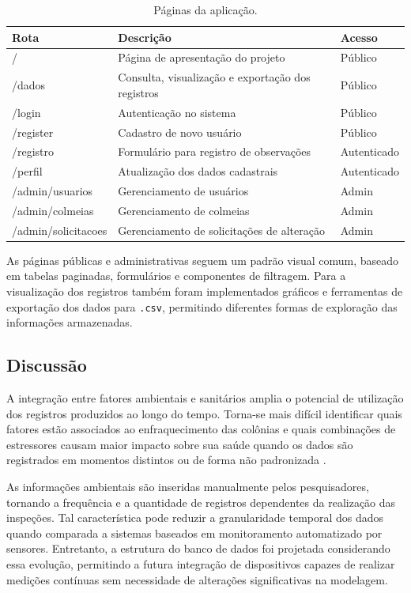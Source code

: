 \documentclass[12pt]{unisenaiclass}
\begin{document}
\renewcommand{\arraystretch}{1.0}

\begin{longtable}{lp{5cm}l}
\caption{Páginas da aplicação.}
\label{tab:paginas}\\

\hline
\textbf{Rota} & \textbf{Descrição} & \textbf{Acesso} \\
\hline
/ & Página de apresentação do projeto & Público \\
/dados & Consulta, visualização e exportação dos registros & Público \\
/login & Autenticação no sistema & Público \\
/register & Cadastro de novo usuário & Público \\
/registro & Formulário para registro de observações & Autenticado \\
/perfil & Atualização dos dados cadastrais & Autenticado \\
/admin/usuarios & Gerenciamento de usuários & Admin \\
/admin/colmeias & Gerenciamento de colmeias & Admin \\
/admin/solicitacoes & Gerenciamento de solicitações de alteração & Admin \\
\hline
\end{longtable}

As páginas públicas e administrativas seguem um padrão visual comum, baseado em tabelas paginadas, formulários e componentes de filtragem. Para a visualização dos registros também foram implementados gráficos e ferramentas de exportação dos dados para \texttt{.csv}, permitindo diferentes formas de exploração das informações armazenadas.

\subsection{Discussão}

A integração entre fatores ambientais e sanitários amplia o potencial de utilização dos registros produzidos ao longo do tempo. Torna-se mais difícil identificar quais fatores estão associados ao enfraquecimento das colônias e quais combinações de estressores causam maior impacto sobre sua saúde quando os dados são registrados em momentos distintos ou de forma não padronizada \cite{brydenstress2013}.

As informações ambientais são inseridas manualmente pelos pesquisadores, tornando a frequência e a quantidade de registros dependentes da realização das inspeções. Tal característica pode reduzir a granularidade temporal dos dados quando comparada a sistemas baseados em monitoramento automatizado por sensores. Entretanto, a estrutura do banco de dados foi projetada considerando essa evolução, permitindo a futura integração de dispositivos capazes de realizar medições contínuas sem necessidade de alterações significativas na modelagem.
\end{document}

